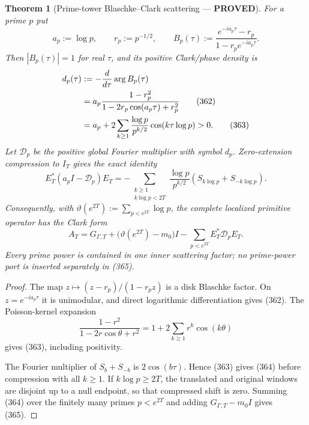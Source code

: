 \documentclass[11pt]{article}
\newtheorem{theorem}{Theorem}
\newcommand{\PROVED}{\textcolor{green!45!black}{\textbf{PROVED}}}
\begin{document}
\begin{theorem}[Prime-tower Blaschke--Clark scattering --- \PROVED]
For a prime $p$ put
\begin{equation}
 a_p:=\log p,\qquad r_p:=p^{-1/2},\qquad
 B_p(\tau):=
 \frac{e^{-ia_p\tau}-r_p}{1-r_pe^{-ia_p\tau}}.       \tag{361}
\end{equation}
Then $|B_p(\tau)|=1$ for real $\tau$, and its positive Clark/phase density is
\begin{align}
 d_p(\tau)
 &:=-\frac{d}{d\tau}\arg B_p(\tau)\notag\\
 &=a_p\frac{1-r_p^2}
             {1-2r_p\cos(a_p\tau)+r_p^2}             \tag{362}\\
 &=a_p+2\sum_{k\ge1}
       \frac{\log p}{p^{k/2}}\cos(k\tau\log p)>0.   \tag{363}
\end{align}
Let $\mathcal D_p$ be the positive global Fourier multiplier with symbol
$d_p$.  Zero-extension compression to $I_T$ gives the exact identity
\begin{equation}
 \boxed{
 E_T^*(a_pI-\mathcal D_p)E_T
 =-\sum_{\substack{k\ge1\\k\log p<2T}}
   \frac{\log p}{p^{k/2}}
       (S_{k\log p}+S_{-k\log p}).}                 \tag{364}
\end{equation}
Consequently, with
$\vartheta(e^{2T}):=\sum_{p<e^{2T}}\log p$, the complete localized
primitive operator has the Clark form
\begin{equation}
 \boxed{
 A_T=G_{\Gamma,T}
   +\bigl(\vartheta(e^{2T})-m_0\bigr)I
   -\sum_{p<e^{2T}}E_T^*\mathcal D_pE_T.}            \tag{365}
\end{equation}
Every prime power is contained in one inner scattering factor; no
prime-power port is inserted separately in (365).
\end{theorem}

\begin{proof}
The map $z\mapsto(z-r_p)/(1-r_pz)$ is a disk Blaschke factor.  On
$z=e^{-ia_p\tau}$ it is unimodular, and direct logarithmic differentiation
gives (362).  The Poisson-kernel expansion
\[
 \frac{1-r^2}{1-2r\cos\theta+r^2}
 =1+2\sum_{k\ge1}r^k\cos(k\theta)
\]
gives (363), including positivity.

The Fourier multiplier of
$S_b+S_{-b}$ is $2\cos(b\tau)$.  Hence (363) gives (364) before compression
with all $k\ge1$.  If $k\log p\ge2T$, the translated and original windows
are disjoint up to a null endpoint, so that compressed shift is zero.
Summing (364) over the finitely many primes $p<e^{2T}$ and adding
$G_{\Gamma,T}-m_0I$ gives (365).
\end{proof}
\end{document}
